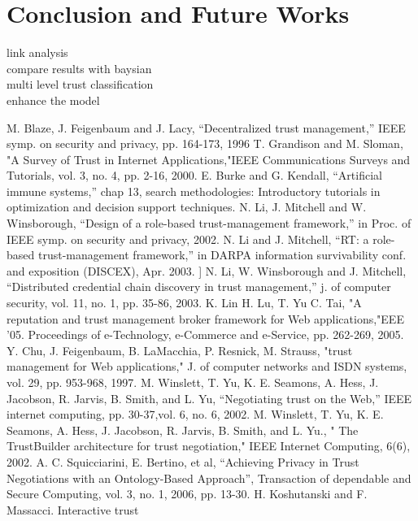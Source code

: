 \documentclass{llncs}
\begin{document}
\section{Conclusion and Future Works}
link analysis\\
compare results with baysian \\
multi level trust classification\\
enhance the model


\begin{thebibliography}{99.}%
 M. Blaze, J. Feigenbaum and J. Lacy, “Decentralized trust management,” IEEE
symp. on security and privacy, pp. 164-173, 1996
T. Grandison and M. Sloman, "A Survey of Trust in Internet Applications,"IEEE Communications Surveys and Tutorials, vol. 3, no. 4, pp. 2-16, 2000.
 E.  Burke and G. Kendall, “Artificial immune systems,”  chap 13,  search methodologies: Introductory tutorials in optimization and decision support techniques. 
N. Li, J. Mitchell and W. Winsborough, “Design of a role-based trust-management
framework,” in Proc. of IEEE symp. on security and privacy, 2002.
 N. Li and J. Mitchell, “RT: a role-based trust-management framework,” in DARPA
information survivability conf. and exposition (DISCEX), Apr. 2003.
 ] N. Li, W. Winsborough and J. Mitchell, “Distributed credential chain discovery in
trust management,” j. of computer security, vol. 11, no. 1, pp. 35-86, 2003.
 K. Lin   H. Lu,   T. Yu   C. Tai, "A reputation and trust management broker framework for Web applications,"EEE '05. Proceedings of e-Technology, e-Commerce and e-Service, pp. 262-269, 2005.
  Y. Chu, J. Feigenbaum, B. LaMacchia,  P. Resnick, M. Strauss, "trust management for Web applications," J. of computer networks and ISDN systems, vol. 29, pp. 953-968, 1997. 
 M. Winslett, T. Yu, K. E. Seamons, A. Hess, J. Jacobson, R. Jarvis, B. Smith, and L.
Yu, “Negotiating trust on the Web,” IEEE internet computing, pp. 30-37,vol. 6, no.
6, 2002.
 M. Winslett, T. Yu, K. E. Seamons, A. Hess, J. Jacobson, 
R. Jarvis, B. Smith, and L. Yu., " The TrustBuilder architecture for trust negotiation," IEEE Internet Computing, 6(6), 2002.
 A. C. Squicciarini, E. Bertino, et al, “Achieving
Privacy in Trust Negotiations with an Ontology-Based
Approach”, Transaction of dependable and Secure
Computing, vol. 3, no. 1, 2006, pp. 13-30.
 H. Koshutanski and F. Massacci. Interactive trust 

\end{thebibliography}
\end{document}
